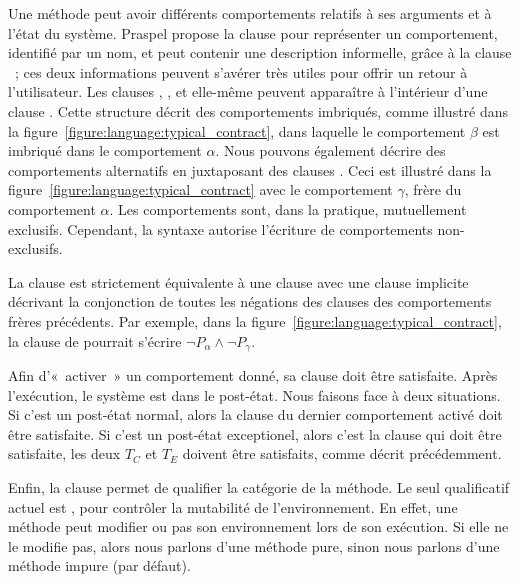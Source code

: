 Une méthode peut avoir différents {\strong comportements} relatifs à ses
arguments et à l'état du système. Praspel propose la clause \abehavior pour
représenter un comportement, identifié par un nom, et peut contenir une
description informelle, grâce à la clause \adescription~; ces deux informations
peuvent s'avérer très utiles pour offrir un retour à l'utilisateur.  Les clauses
\arequires, \aensures, \athrowable et \abehavior elle-même peuvent apparaître à
l'intérieur d'une clause \abehavior. Cette structure décrit des comportements
{\strong imbriqués}, comme illustré dans la
figure~\ref{figure:language:typical_contract}, dans laquelle le comportement
$\beta$ est imbriqué dans le comportement $\alpha$. Nous pouvons également
décrire des comportements {\strong alternatifs} en juxtaposant des clauses
\abehavior. Ceci est illustré dans la
figure~\ref{figure:language:typical_contract} avec le comportement $\gamma$,
frère du comportement $\alpha$. Les comportements sont, dans la pratique,
{\strong mutuellement exclusifs}. Cependant, la syntaxe autorise l'écriture de
comportements non-exclusifs.

La clause \adefault est strictement équivalente à une clause \abehavior avec une
clause \arequires implicite décrivant la conjonction de toutes les négations des
clauses \arequires des comportements frères précédents.  Par exemple, dans la
figure~\ref{figure:language:typical_contract}, la clause \arequires de \adefault
pourrait s'écrire $\neg P_\alpha \land \neg P_\gamma$.

Afin d'«~activer~» un comportement donné, sa clause \arequires doit être
satisfaite. Après l'exécution, le système est dans le post-état. Nous faisons
face à deux situations. Si c'est un post-état normal, alors la clause \aensures
du dernier comportement activé doit être satisfaite. Si c'est un post-état
exceptionel, alors c'est la clause \athrowable qui doit être satisfaite, \ie les
deux $T_C$ et $T_E$ doivent être satisfaits, comme décrit précédemment.

Enfin, la clause \ais permet de qualifier la catégorie de la méthode. Le seul
qualificatif actuel est , pour contrôler la mutabilité de
l'environnement. En effet, une méthode peut modifier ou pas son environnement
lors de son exécution. Si elle ne le modifie pas, alors nous parlons d'une
méthode {\strong pure}, sinon nous parlons d'une méthode {\strong impure} (par
défaut). \\

